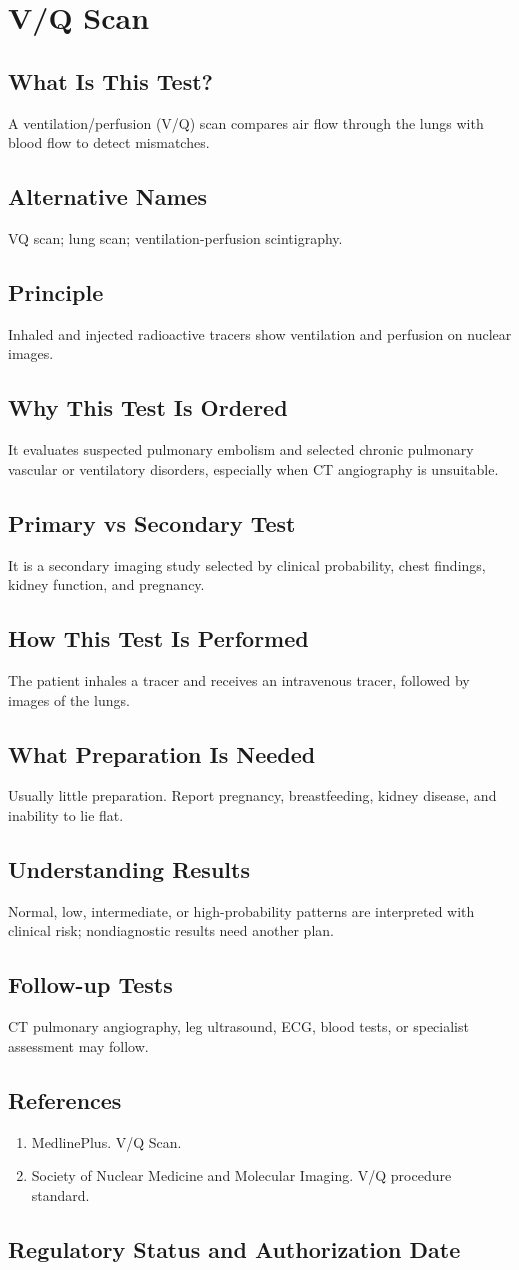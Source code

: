 \chapter{V/Q Scan}
\section*{What Is This Test?} A ventilation/perfusion (V/Q) scan compares air flow through the lungs with blood flow to detect mismatches.\section*{Alternative Names} VQ scan; lung scan; ventilation-perfusion scintigraphy.\section*{Principle} Inhaled and injected radioactive tracers show ventilation and perfusion on nuclear images.\section*{Why This Test Is Ordered} It evaluates suspected pulmonary embolism and selected chronic pulmonary vascular or ventilatory disorders, especially when CT angiography is unsuitable.\section*{Primary vs Secondary Test} It is a secondary imaging study selected by clinical probability, chest findings, kidney function, and pregnancy.\section*{How This Test Is Performed} The patient inhales a tracer and receives an intravenous tracer, followed by images of the lungs.\section*{What Preparation Is Needed} Usually little preparation. Report pregnancy, breastfeeding, kidney disease, and inability to lie flat.\section*{Understanding Results} Normal, low, intermediate, or high-probability patterns are interpreted with clinical risk; nondiagnostic results need another plan.\section*{Follow-up Tests} CT pulmonary angiography, leg ultrasound, ECG, blood tests, or specialist assessment may follow.\section*{References} \begin{enumerate}\item MedlinePlus. V/Q Scan.\item Society of Nuclear Medicine and Molecular Imaging. V/Q procedure standard.\end{enumerate}\clearpage\section*{Regulatory Status and Authorization Date}\clearpage
